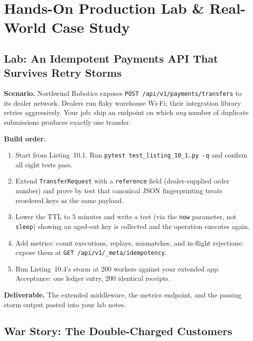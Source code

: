 \section{Hands-On Production Lab \& Real-World Case Study}
\label{sec:ch10-lab}

\subsection{Lab: An Idempotent Payments API That Survives Retry Storms}

\textbf{Scenario.} Northwind Robotics exposes
\texttt{POST /api/v1/payments/transfers} to its dealer network. Dealers run
flaky warehouse Wi-Fi; their integration library retries aggressively. Your
job: ship an endpoint on which \emph{any} number of duplicate submissions
produces exactly one transfer.

\textbf{Build order.}
\begin{enumerate}
  \item Start from Listing~10.1. Run
        \texttt{pytest test\_listing\_10\_1.py -q} and confirm all eight
        tests pass.
  \item Extend \texttt{TransferRequest} with a \texttt{reference} field
        (dealer-supplied order number) and prove by test that canonical JSON
        fingerprinting treats reordered keys as the same payload.
  \item Lower the TTL to 5 minutes and write a test (via the
        \texttt{now} parameter, not \texttt{sleep}) showing an aged-out key
        is collected and the operation executes again.
  \item Add metrics: count executions, replays, mismatches, and in-flight
        rejections; expose them at \texttt{GET /api/v1/\_meta/idempotency}.
  \item Run Listing~10.4's storm at 200 workers against your extended app.
        Acceptance: one ledger entry, 200 identical receipts.
\end{enumerate}

\textbf{Deliverable.} The extended middleware, the metrics endpoint, and the
passing storm output pasted into your lab notes.

\subsection{War Story: The Double-Charged Customers}
\label{sec:ch10-warstory}

